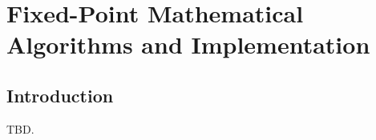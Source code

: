 \chapter{Fixed-Point Mathematical Algorithms and Implementation}        
\label{cmal2}

\section{Introduction}
\label{cmal2:sint0}

TBD.



